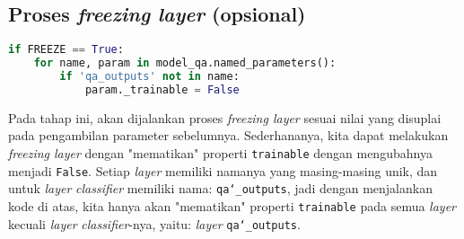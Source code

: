 \subsection{Proses \emph{freezing layer} (opsional)}
\begin{lstlisting}[language=Python, caption=Proses \emph{freezing layer} (opsional)]
if FREEZE == True:
    for name, param in model_qa.named_parameters():
        if 'qa_outputs' not in name:
            param._trainable = False
\end{lstlisting}

Pada tahap ini, akan dijalankan proses \emph{freezing layer} sesuai nilai yang disuplai pada pengambilan parameter sebelumnya. Sederhananya, kita dapat melakukan \emph{freezing layer} dengan "mematikan" properti \texttt{trainable} dengan mengubahnya menjadi \texttt{False}. Setiap \emph{layer} memiliki namanya yang masing-masing unik, dan untuk \emph{layer} \emph{classifier} memiliki nama: \texttt{qa\char`_outputs}, jadi dengan menjalankan kode di atas, kita hanya akan "mematikan" properti \texttt{trainable} pada semua \emph{layer} kecuali \emph{layer} \emph{classifier}-nya, yaitu: \emph{layer} \texttt{qa\char`_outputs}.

